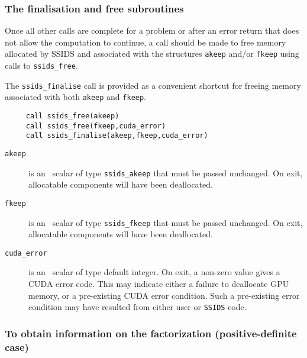 \documentclass{spral}
\begin{document}

\subsubsection{The finalisation and free subroutines}
Once all other calls are complete for a problem or after an error
return that does not allow the computation to continue,
a call should be made to free memory allocated by SSIDS and
associated with the structures {\tt akeep} and/or {\tt fkeep} using calls to
\texttt{ssids\_free}.

\noindent
The \texttt{ssids\_finalise} call is provided as a convenient shortcut for
freeing memory associated with both \texttt{akeep} and \texttt{fkeep}.

\begin{verbatim}
     call ssids_free(akeep)
     call ssids_free(fkeep,cuda_error)
     call ssids_finalise(akeep,fkeep,cuda_error)
\end{verbatim}

\vspace*{-3mm}
\begin{description}

\item[\texttt{akeep}] is an \intentinout\ scalar  of type {\tt ssids\_akeep}
that must be passed unchanged.
On exit, allocatable components will have been deallocated.

\item[\texttt{fkeep}] is an \intentinout\ scalar  of type {\tt ssids\_fkeep}
that must be passed unchanged.
On exit, allocatable components will have been deallocated.

\item[\texttt{cuda\_error}] is an \intentout\ scalar of type default integer.
On exit, a non-zero value gives a CUDA error code. This may indicate either
a failure to deallocate GPU memory, or a pre-existing CUDA error condition.
Such a pre-existing error condition may have resulted from either user or
\texttt{SSIDS} code.


\end{description}


\subsubsection{To obtain information on the factorization (positive-definite case)}
\end{document}
